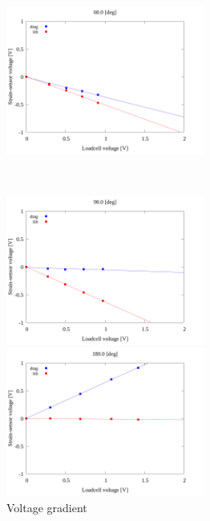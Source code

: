 \begin{figure}[htbp]
\begin{minipage}[b]{0.45\linewidth}
  \end{minipage}
  \begin{minipage}[b]{0.45\linewidth}
    \centering
    \includegraphics[width=65mm]{../../02_workspace/result/2-1/plot/04/04_linear_600.png}
  \end{minipage} \\
  \begin{minipage}[b]{0.45\linewidth}
    \centering
    \includegraphics[width=65mm]{../../02_workspace/result/2-1/plot/04/04_linear_900.png}
  \end{minipage}
  \begin{minipage}[b]{0.45\linewidth}
    \centering
    \includegraphics[width=65mm]{../../02_workspace/result/2-1/plot/04/04_linear_1800.png}
  \end{minipage}
  \caption{Voltage gradient}
\end{figure}

